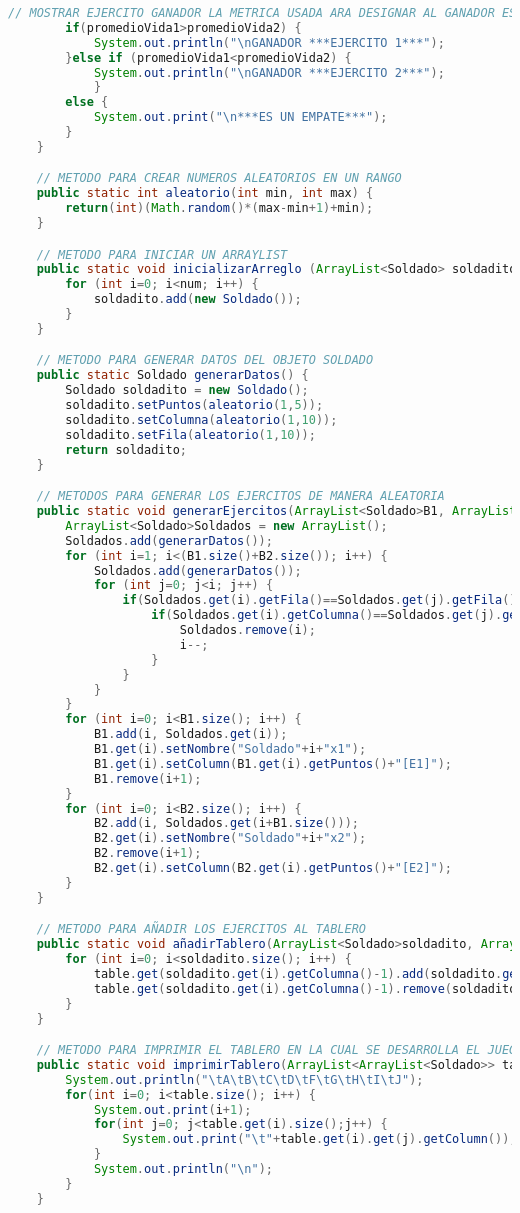 \documentclass{article}
\begin{document}
\begin{itemize}
\begin{itemize}
\begin{lstlisting}[language=java]
		// MOSTRAR EJERCITO GANADOR LA METRICA USADA ARA DESIGNAR AL GANADOR ES POR EL NIVEL DEL PROMEDIO DE VIDA DE CADA EJERCITO
		if(promedioVida1>promedioVida2) {
			System.out.println("\nGANADOR ***EJERCITO 1***");
		}else if (promedioVida1<promedioVida2) {
			System.out.println("\nGANADOR ***EJERCITO 2***");
			}
		else {
			System.out.print("\n***ES UN EMPATE***");
		}
	}

	// METODO PARA CREAR NUMEROS ALEATORIOS EN UN RANGO
	public static int aleatorio(int min, int max) {
		return(int)(Math.random()*(max-min+1)+min);
	}

	// METODO PARA INICIAR UN ARRAYLIST
	public static void inicializarArreglo (ArrayList<Soldado> soldadito, int num) {
		for (int i=0; i<num; i++) {
			soldadito.add(new Soldado());
		}
	}

	// METODO PARA GENERAR DATOS DEL OBJETO SOLDADO
	public static Soldado generarDatos() {
		Soldado soldadito = new Soldado();
		soldadito.setPuntos(aleatorio(1,5));
		soldadito.setColumna(aleatorio(1,10));
		soldadito.setFila(aleatorio(1,10));
		return soldadito;
	}

	// METODOS PARA GENERAR LOS EJERCITOS DE MANERA ALEATORIA
	public static void generarEjercitos(ArrayList<Soldado>B1, ArrayList<Soldado>B2) {
		ArrayList<Soldado>Soldados = new ArrayList();
		Soldados.add(generarDatos());
		for (int i=1; i<(B1.size()+B2.size()); i++) {
			Soldados.add(generarDatos());
			for (int j=0; j<i; j++) {
				if(Soldados.get(i).getFila()==Soldados.get(j).getFila()) {
					if(Soldados.get(i).getColumna()==Soldados.get(j).getColumna()){
						Soldados.remove(i);
						i--;
					}
				}
			}
		}
		for (int i=0; i<B1.size(); i++) {
			B1.add(i, Soldados.get(i));
			B1.get(i).setNombre("Soldado"+i+"x1");
			B1.get(i).setColumn(B1.get(i).getPuntos()+"[E1]");
			B1.remove(i+1);
		}
		for (int i=0; i<B2.size(); i++) {
			B2.add(i, Soldados.get(i+B1.size()));
			B2.get(i).setNombre("Soldado"+i+"x2");
			B2.remove(i+1);
			B2.get(i).setColumn(B2.get(i).getPuntos()+"[E2]");
		}
	}

	// METODO PARA AÑADIR LOS EJERCITOS AL TABLERO
	public static void añadirTablero(ArrayList<Soldado>soldadito, ArrayList<ArrayList<Soldado>>table) {
		for (int i=0; i<soldadito.size(); i++) {
			table.get(soldadito.get(i).getColumna()-1).add(soldadito.get(i).getFila()-1,soldadito.get(i));
			table.get(soldadito.get(i).getColumna()-1).remove(soldadito.get(i).getFila());
		}
	}

	// METODO PARA IMPRIMIR EL TABLERO EN LA CUAL SE DESARROLLA EL JUEGO
	public static void imprimirTablero(ArrayList<ArrayList<Soldado>> table) {
		System.out.println("\tA\tB\tC\tD\tF\tG\tH\tI\tJ");
		for(int i=0; i<table.size(); i++) {
			System.out.print(i+1);
			for(int j=0; j<table.get(i).size();j++) {
				System.out.print("\t"+table.get(i).get(j).getColumn());
			}
			System.out.println("\n");
		}
	}
	

\end{lstlisting}
\end{itemize}
\end{itemize}
\end{document}
